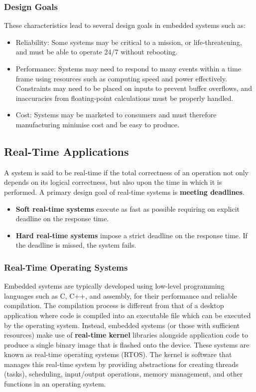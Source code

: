 \documentclass{article}
\begin{document}
\subsubsection{Design Goals}
These characteristics lead to several design goals in embedded systems
such as:
\begin{itemize}
    \item Reliability: Some systems may be critical to a mission, or
          life-threatening, and must be able to operate 24/7 without
          rebooting.
    \item Performance: Systems may need to respond to many events
          within a time frame using resources such as computing speed
          and power effectively. Constraints may need to be placed on
          inputs to prevent buffer overflows, and inaccuracies from
          floating-point calculations must be properly handled.
    \item Cost: Systems may be marketed to consumers and must therefore
          manufacturing minimise cost and be easy to produce.
\end{itemize}
\subsection{Real-Time Applications}
A system is said to be real-time if the total correctness of an
operation not only depends on its logical correctness, but also upon
the time in which it is performed. A primary design goal of real-time
systems is \textbf{meeting deadlines}.
\begin{itemize}
    \item \textbf{Soft real-time systems} execute as fast as possible requiring
          on explicit deadline on the response time.
    \item \textbf{Hard real-time systems} impose a strict deadline on the
          response time. If the deadline is missed, the system fails.
\end{itemize}
\subsubsection{Real-Time Operating Systems}
Embedded systems are typically developed using low-level programming
languages such as C, C++, and assembly, for their performance and
reliable compilation. The compilation process is different from that of
a desktop application where code is compiled into an executable file
which can be executed by the operating system. Instead, embedded
systems (or those with sufficient resources) make use of
\textbf{real-time kernel} libraries alongside application code to
produce a single binary image that is flashed onto the device. These
systems are known as real-time operating systems (RTOS). The kernel is
software that manages this real-time system by providing abstractions
for creating threads (tasks), scheduling, input/output operations,
memory management, and other functions in an operating system.
\end{document}
